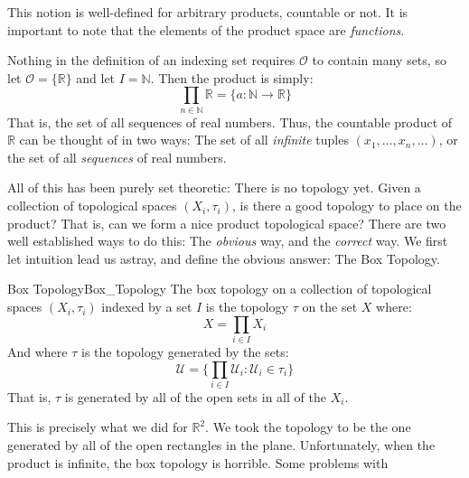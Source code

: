     This notion is well-defined for arbitrary products, countable
    or not. It is important to note that the elements of the
    product space are \textit{functions}.
    \begin{lexample}
        Nothing in the definition of an indexing set requires
        $\mathcal{O}$ to contain many sets, so let
        $\mathcal{O}=\{\mathbb{R}\}$ and let $I=\mathbb{N}$.
        Then the product is simply:
        \begin{equation}
            \prod_{n\in\mathbb{N}}\mathbb{R}=
                \{a:\mathbb{N}\rightarrow\mathbb{R}\}
        \end{equation}
        That is, the set of all sequences of real numbers.
        Thus, the countable product of $\mathbb{R}$ can be
        thought of in two ways: The set of all
        \textit{infinite} tuples
        $(x_{1},\dots,x_{n},\dots)$, or the set of all
        \textit{sequences} of real numbers.
    \end{lexample}
    All of this has been purely set theoretic: There is no topology
    yet. Given a collection of topological spaces
    $(X_{i},\tau_{i})$, is there a good topology to place on the
    product? That is, can we form a nice product topological space?
    There are two well established ways to do this:
    The \textit{obvious} way, and the \textit{correct} way.
    We first let intuition lead us astray, and define the obvious
    answer: The Box Topology.
    \begin{ldefinition}{Box Topology}{Box_Topology}
        The box topology on a collection of topological spaces
        $(X_{i},\tau_{i})$ indexed by a set $I$ is the topology
        $\tau$ on the set $X$ where:
        \begin{equation}
            X=\prod_{i\in{I}}X_{i}
        \end{equation}
        And where $\tau$ is the topology generated by the sets:
        \begin{equation}
            \mathcal{U}=
                \big\{\prod_{i\in{I}}\mathcal{U}_{i}:
                    \mathcal{U}_{i}\in\tau_{i}\big\}
        \end{equation}
        That is, $\tau$ is generated by all of the open sets
        in all of the $X_{i}$.
    \end{ldefinition}
    This is precisely what we did for $\mathbb{R}^{2}$.
    We took the topology to be the one generated by all of the open
    rectangles in the plane. Unfortunately, when the product is
    infinite, the box topology is horrible. Some problems with
